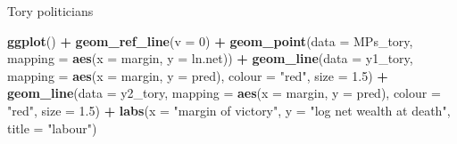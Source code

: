 \documentclass[]{book}
\newenvironment{Shaded}{\begin{snugshade}}{\end{snugshade}}
\newcommand{\KeywordTok}[1]{\textcolor[rgb]{0.13,0.29,0.53}{\textbf{#1}}}
\newcommand{\DataTypeTok}[1]{\textcolor[rgb]{0.13,0.29,0.53}{#1}}
\newcommand{\DecValTok}[1]{\textcolor[rgb]{0.00,0.00,0.81}{#1}}
\newcommand{\FloatTok}[1]{\textcolor[rgb]{0.00,0.00,0.81}{#1}}
\newcommand{\StringTok}[1]{\textcolor[rgb]{0.31,0.60,0.02}{#1}}
\newcommand{\OperatorTok}[1]{\textcolor[rgb]{0.81,0.36,0.00}{\textbf{#1}}}
\newcommand{\NormalTok}[1]{#1}
\theoremstyle{definition}
\theoremstyle{definition}
\theoremstyle{definition}
\theoremstyle{remark}
\begin{document}
\begin{Shaded}
\end{Shaded}

Tory politicians

\begin{Shaded}
\begin{Highlighting}[]
\KeywordTok{ggplot}\NormalTok{() }\OperatorTok{+}
\StringTok{  }\KeywordTok{geom_ref_line}\NormalTok{(}\DataTypeTok{v =} \DecValTok{0}\NormalTok{) }\OperatorTok{+}
\StringTok{  }\KeywordTok{geom_point}\NormalTok{(}\DataTypeTok{data =}\NormalTok{ MPs_tory,}
             \DataTypeTok{mapping =} \KeywordTok{aes}\NormalTok{(}\DataTypeTok{x =}\NormalTok{ margin, }\DataTypeTok{y =}\NormalTok{ ln.net)) }\OperatorTok{+}
\StringTok{  }\KeywordTok{geom_line}\NormalTok{(}\DataTypeTok{data =}\NormalTok{ y1_tory,}
            \DataTypeTok{mapping =} \KeywordTok{aes}\NormalTok{(}\DataTypeTok{x =}\NormalTok{ margin, }\DataTypeTok{y =}\NormalTok{ pred), }\DataTypeTok{colour =} \StringTok{"red"}\NormalTok{, }\DataTypeTok{size =} \FloatTok{1.5}\NormalTok{) }\OperatorTok{+}
\StringTok{  }\KeywordTok{geom_line}\NormalTok{(}\DataTypeTok{data =}\NormalTok{ y2_tory,}
            \DataTypeTok{mapping =} \KeywordTok{aes}\NormalTok{(}\DataTypeTok{x =}\NormalTok{ margin, }\DataTypeTok{y =}\NormalTok{ pred), }\DataTypeTok{colour =} \StringTok{"red"}\NormalTok{, }\DataTypeTok{size =} \FloatTok{1.5}\NormalTok{) }\OperatorTok{+}
\StringTok{  }\KeywordTok{labs}\NormalTok{(}\DataTypeTok{x =} \StringTok{"margin of victory"}\NormalTok{, }\DataTypeTok{y =} \StringTok{"log net wealth at death"}\NormalTok{,}
       \DataTypeTok{title =} \StringTok{"labour"}\NormalTok{)}
\end{Highlighting}
\end{Shaded}
\end{document}
